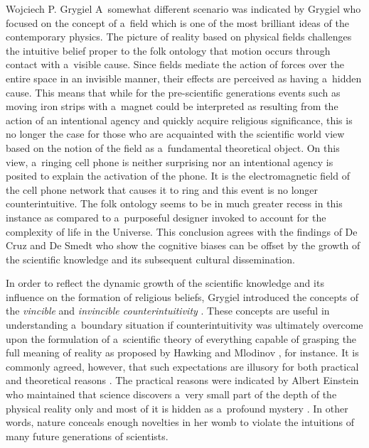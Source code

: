 \begin{artengenv}{Wojciech P. Grygiel}
A~somewhat different scenario was indicated by Grygiel
\parencite*[][]{grygiel_doctrine_2020} %
 who focused on the concept of a~field which is one of the most brilliant ideas of the contemporary physics. The picture of reality based on physical fields challenges the intuitive belief proper to the folk ontology that motion occurs through contact with a~visible cause. Since fields mediate the action of forces over the entire space in an invisible manner, their effects are perceived as having a~hidden cause. This means that while for the pre-scientific generations events such as moving iron strips with a~magnet could be interpreted as resulting from the action of an intentional agency and quickly acquire religious significance, this is no longer the case for those who are acquainted with the scientific world view based on the notion of the field as a~fundamental theoretical object. On this view, a~ringing cell phone is neither surprising nor an intentional agency is posited to explain the activation of the phone. It is the electromagnetic field of the cell phone network that causes it to ring and this event is no longer counterintuitive. The folk ontology seems to be in much greater recess in this instance as compared to a~purposeful designer invoked to account for the complexity of life in the Universe. This conclusion agrees with the findings of De Cruz and De Smedt 
\parencite*[][]{de_cruz_evolved_2012} %
 who show the cognitive biases can be offset by the growth of the scientific knowledge and its subsequent cultural dissemination.

In order to reflect the dynamic growth of the scientific knowledge and its influence on the formation of religious beliefs, Grygiel introduced the concepts of the \textit{vincible} and \textit{invincible counterintuitivity}
\parencites[][]{grygiel_science_2017}[see also][]{van_eyghen_religious_2020}. %
 These concepts are useful in understanding a~boundary situation if counterintuitivity was ultimately overcome upon the formulation of a~scientific theory of everything capable of grasping the full meaning of reality as proposed by Hawking and Mlodinov 
\parencite*[][]{hawking_grand_2010}, %
 for instance. It is commonly agreed, however, that such expectations are illusory for both practical and theoretical reasons 
\parencite[e.g.][]{heller_teorie_2006}. %
 The practical reasons were indicated by Albert Einstein who maintained that science discovers a~very small part of the depth of the physical reality only and most of it is hidden as a~profound mystery 
\parencite[][]{einstein_world_1931}. %
 In other words, nature conceals enough novelties in her womb to violate the intuitions of many future generations of scientists.


\end{artengenv}

